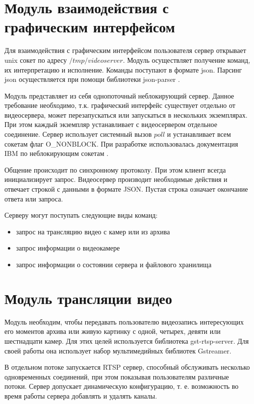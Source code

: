 \section{Модуль взаимодействия с графическим интерфейсом}
Для взаимодействия с графическим интерфейсом пользователя сервер открывает unix сокет
по адресу $/tmp/videoserver$. Модуль осуществляет получение команд, их интерпретацию и исполнение.
Команды поступают в формате json. Парсинг json осуществляется при помощи библиотеки json-parser
\cite{json_parser}.

Модуль представляет из себя однопоточный неблокирующий сервер. Данное требование необходимо, т.к.
графический интерфейс существует отдельно от видеосервера, может перезапускаться или запускаться в
нескольких экземплярах. При этом каждый экземпляр устанавливает с видеосервером отдельное соединение.
Сервер использует системный вызов $poll$ и устанавливает всем сокетам флаг O\_NONBLOCK.
При разработке использовалась документация IBM по неблокирующим сокетам \cite{socket_doc}.

Общение происходит по синхронному протоколу. При этом клиент всегда инициализирует запрос.
Видеосервер производит необходимые действия и отвечает строкой с данными в формате JSON.
Пустая строка означает окончание ответа или запроса.

Серверу могут поступать следующие виды команд:
\smallskip
\begin{itemize}
	\item запрос на трансляцию видео с камер или из архива
	\item запрос информации о видеокамере
	\item запрос информации о состоянии сервера и файлового хранилища
\end{itemize}

\section{Модуль трансляции видео}
Модуль необходим, чтобы передавать пользователю видеозапись интересующих его моментов архива или
живую картинку с одной, четырех, девяти или шестнадцати камер.
Для этих целей используется библиотека gst-rtsp-server. Для своей работы она использует набор
мультимедийных библиотек Gstreamer.

В отдельном потоке запускается RTSP сервер, способный обслуживать несколько одновременных соединений,
при этом показывая пользователям различные потоки.
Сервер допускает динамическую конфигурацию, т. е. возможность во время работы сервера добавлять
и удалять каналы.

